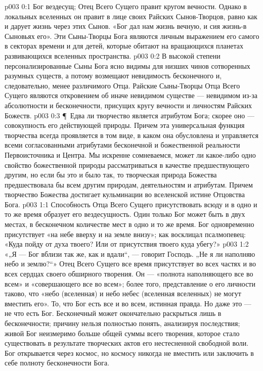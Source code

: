 \vs p003 0:1 Бог вездесущ; Отец Всего Сущего правит кругом вечности. Однако в локальных вселенных он правит в лице своих Райских Сынов\hyp{}Творцов, равно как и дарует жизнь через этих Сынов. «Бог дал нам жизнь вечную, и сия жизнь\hyp{}в Сыновьях его». Эти Сыны\hyp{}Творцы Бога являются личным выражением его самого в секторах времени и для детей, которые обитают на вращающихся планетах развивающихся вселенных пространства.
\vs p003 0:2 В высокой степени персонализированные Сыны Бога ясно видимы для низших чинов сотворенных разумных существ, а потому возмещают невидимость бесконечного и, следовательно, менее различимого Отца. Райские Сыны\hyp{}Творцы Отца Всего Сущего являются откровением об иначе невидимом существе --- невидимом из\hyp{}за абсолютности и бесконечности, присущих кругу вечности и личностям Райских Божеств.
\vs p003 0:3 \P\ Едва ли творчество является атрибутом Бога; скорее оно --- совокупность его действующей природы. Причем эта универсальная функция творчества всегда проявляется в том виде, в каком она обусловлена и управляется всеми согласованными атрибутами бесконечной и божественной реальности Первоисточника и Центра. Мы искренне сомневаемся, может ли какое\hyp{}либо одно свойство божественной природы рассматриваться в качестве предшествующего другим, но если бы это и было так, то творческая природа Божества предшествовала бы всем другим природам, деятельностям и атрибутам. Причем творчество Божества достигает кульминации во вселенской истине Отцовства Бога.
\vs p003 1:1 Способность Отца Всего Сущего присутствовать всюду и в одно и то же время образует его вездесущность. Один только Бог может быть в двух местах, в бесконечном количестве мест в одно и то же время. Бог одновременно присутствует «на небе вверху и на земле внизу»; как восклицал псалмопевец: «Куда пойду от духа твоего? Или от присутствия твоего куда убегу?»
\vs p003 1:2 «„Я --- Бог вблизи так же, как и вдали“, --- говорит Господь. „Не я ли наполняю небо и землю?“» Отец Всего Сущего все время присутствует во всех частях и во всех сердцах своего обширного творения. Он --- «полнота наполняющего все во всем» и «совершающего все во всем»; более того, представление о его личности таково, что «небо (вселенная) и небо небес (вселенная вселенных) не могут вместить его». То, что Бог есть все и во всем, истинная правда. Но даже это --- не  что есть Бог. Бесконечный может окончательно раскрыться лишь в бесконечности; причину нельзя полностью понять, анализируя последствия; живой Бог неизмеримо больше общей суммы всего творения, которое стало существовать в результате творческих актов его нестесненной свободной воли. Бог открывается через космос, но космосу никогда не вместить или заключить в себе полноту бесконечности Бога.
